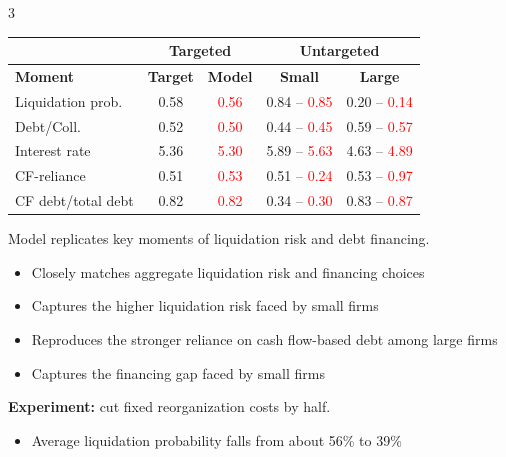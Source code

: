\documentclass[10pt]{article}
\begin{document}
\begin{multicols}{3}
\begin{tcolorbox}[title=Model Fit]
\small
\centering
\begin{tabular}{l|cc||cc}
& \multicolumn{2}{c||}{\textbf{Targeted}} & \multicolumn{2}{c}{\textbf{Untargeted}} \\
\toprule
\textbf{Moment} & \textbf{Target} & \textbf{Model} & \textbf{Small} & \textbf{Large} \\
\midrule
Liquidation prob. & 0.58 & \textcolor{red}{0.56} & 0.84 -- \textcolor{red}{0.85} & 0.20 -- \textcolor{red}{0.14} \\
Debt/Coll. & 0.52 & \textcolor{red}{0.50} & 0.44 -- \textcolor{red}{0.45} & 0.59 -- \textcolor{red}{0.57} \\
Interest rate & 5.36 & \textcolor{red}{5.30} & 5.89 -- \textcolor{red}{5.63} & 4.63 -- \textcolor{red}{4.89} \\
CF-reliance & 0.51 & \textcolor{red}{0.53} & 0.51 -- \textcolor{red}{0.24} & 0.53 -- \textcolor{red}{0.97} \\
CF debt/total debt & 0.82 & \textcolor{red}{0.82} & 0.34 -- \textcolor{red}{0.30} & 0.83 -- \textcolor{red}{0.87} \\
\bottomrule
\end{tabular}

\normalsize
\raggedright

\vspace{5.75mm}

Model replicates key moments of liquidation risk and debt financing.
\begin{itemize}
    \item Closely matches aggregate liquidation risk and financing choices
    \item Captures the higher liquidation risk faced by small firms
    \item Reproduces the stronger reliance on cash flow-based debt among large firms
    \item Captures the financing gap faced by small firms
\end{itemize}

\end{tcolorbox}

\columnbreak


\begin{tcolorbox}[title=Main Results: Cutting Reorganization Costs]
\textbf{Experiment:} cut fixed reorganization costs by half.
\begin{itemize}
    \item Average liquidation probability falls from about 56\% to 39\%
\end{itemize}


\end{tcolorbox}
\end{multicols}
\end{document}
